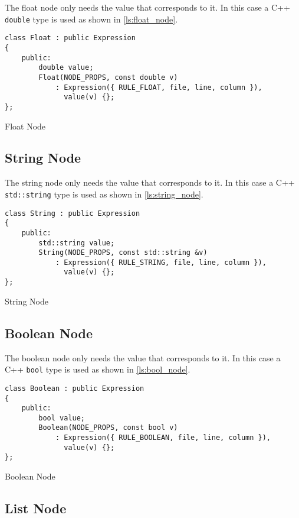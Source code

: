 The float node only needs the value that corresponds to it. In this case a C++ \texttt{double} type is used as shown in
\autoref{ls:float_node}.

\begin{listing}[H]
\begin{verbatim}
class Float : public Expression
{
    public:
        double value;
        Float(NODE_PROPS, const double v)
            : Expression({ RULE_FLOAT, file, line, column }),
              value(v) {};
};
\end{verbatim}
\caption{Float Node}
\label{ls:float_node}
\end{listing}

\subsection{String Node}

The string node only needs the value that corresponds to it. In this case a C++ \texttt{std::string} type is used as shown in
\autoref{ls:string_node}.

\begin{listing}[H]
\begin{verbatim}
class String : public Expression
{
    public:
        std::string value;
        String(NODE_PROPS, const std::string &v)
            : Expression({ RULE_STRING, file, line, column }),
              value(v) {};
};
\end{verbatim}
\caption{String Node}
\label{ls:string_node}
\end{listing}

\subsection{Boolean Node}

The boolean node only needs the value that corresponds to it. In this case a C++ \texttt{bool} type is used as shown in
\autoref{ls:bool_node}.

\begin{listing}[H]
\begin{verbatim}
class Boolean : public Expression
{
    public:
        bool value;
        Boolean(NODE_PROPS, const bool v)
            : Expression({ RULE_BOOLEAN, file, line, column }),
              value(v) {};
};
\end{verbatim}
\caption{Boolean Node}
\label{ls:bool_node}
\end{listing}

\subsection{List Node}

